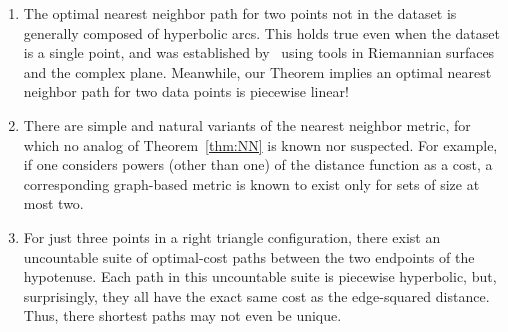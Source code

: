 \begin{enumerate}

\item The optimal nearest neighbor path for two points not in the dataset
is generally composed of hyperbolic arcs.
This holds true even when the dataset is a single point, and was established by~\cite{cohen15approximating} using tools in Riemannian surfaces and the complex plane.
Meanwhile, our Theorem implies an optimal nearest neighbor path for two data points is piecewise linear!

\item There are simple and natural variants of the nearest neighbor metric, for which no analog of Theorem~\ref{thm:NN} is known nor suspected.
For example, if one considers powers (other than one) of the distance function as a cost, a corresponding graph-based metric is known to exist only for sets of size at most two.

\item For just three points in a right triangle configuration, there exist an uncountable suite of optimal-cost paths between the two endpoints of the hypotenuse.
Each path in this uncountable suite is piecewise hyperbolic, but, surprisingly, they all have the exact same cost as the edge-squared distance.
Thus, there shortest paths may not even be unique.


\end{enumerate}
